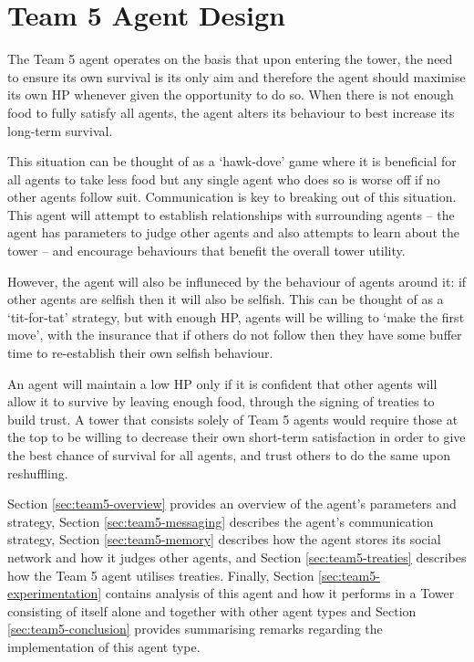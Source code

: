 \chapter{Team 5 Agent Design}\label{team_5_agent_design}

The Team 5 agent operates on the basis that upon entering the tower, the need to ensure its own survival is its only aim and therefore the agent should maximise its own HP whenever given the opportunity to do so. When there is not enough food to fully satisfy all agents, the agent alters its behaviour to best increase its long-term survival.

This situation can be thought of as a `hawk-dove' game where it is beneficial for all agents to take less food but any single agent who does so is worse off if no other agents follow suit. Communication is key to breaking out of this situation. This agent will attempt to establish relationships with surrounding agents -- the agent has parameters to judge other agents and also attempts to learn about the tower -- and encourage behaviours that benefit the overall tower utility.

However, the agent will also be influneced by the behaviour of agents around it: if other agents are selfish then it will also be selfish. This can be thought of as a `tit-for-tat' strategy, but with enough HP, agents will be willing to `make the first move', with the insurance that if others do not follow then they have some buffer time to re-establish their own selfish behaviour.

An agent will maintain a low HP only if it is confident that other agents will allow it to survive by leaving enough food, through the signing of treaties to build trust. A tower that consists solely of Team 5 agents would require those at the top to be willing to decrease their own short-term satisfaction in order to give the best chance of survival for all agents, and trust others to do the same upon reshuffling.

Section \ref{sec:team5-overview} provides an overview of the agent's parameters and strategy, Section \ref{sec:team5-messaging} describes the agent's communication strategy, Section \ref{sec:team5-memory} describes how the agent stores its social network and how it judges other agents, and Section \ref{sec:team5-treaties} describes how the Team 5 agent utilises treaties. Finally, Section \ref{sec:team5-experimentation} contains analysis of this agent and how it performs in a Tower consisting of itself alone and together with other agent types and Section \ref{sec:team5-conclusion} provides summarising remarks regarding the implementation of this agent type.

